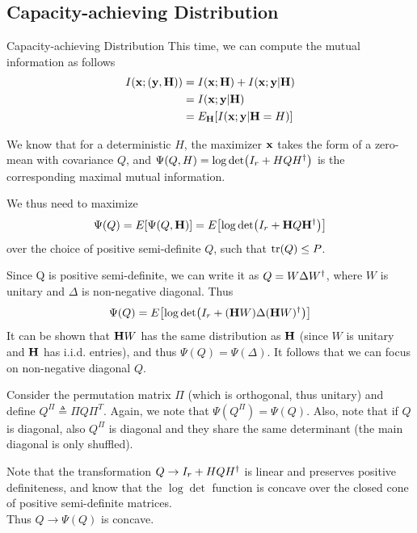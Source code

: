 \subsection{Capacity-achieving Distribution}
\begin{frame}[allowframebreaks]{Capacity-achieving Distribution}
This time, we can compute the mutual information as follows
\begin{align*}
\begin{split}
I(\vb{x;(y,H)}) &= I(\vb{x;H}) + I(\vb{x;y|H})\\
&= I(\vb{x;y|H})\\
&= \Exp[\vb{H}]{I(\vb{x;y|H}=H)}
\end{split}
\end{align*}

We know that for a deterministic $H$, the maximizer $\vb{x}$ takes the form of a zero-mean \cscg{} with covariance $Q$, and $\Psi(Q,H) = \log\det(I_r + HQ\herm{H})$ is the corresponding maximal mutual information.

\medskip
We thus need to maximize
$$\Psi(Q) = \Exp{\Psi(Q,\vb{H})} = \Exp{\log\det(I_r + \vb{H}Q\herm{\vb{H}})}$$
over the choice of positive semi-definite $Q$, such that $\tr(Q)\leq P$.

\framebreak

Since Q is positive semi-definite, we can write it as $Q = W\Delta\herm{W}$, where $W$ is unitary and $\Delta$ is non-negative diagonal. Thus
$$\Psi(Q) = \Exp{\log\det(I_r + (\vb{H}W)\Delta\herm{(\vb{H}W)})}$$
It can be shown that $\vb{H}W$ has the same distribution as $\vb{H}$ (since $W$ is unitary and $\vb{H}$ has i.i.d. entries), and thus $\Psi(Q)=\Psi(\Delta)$. It follows that we can focus on non-negative diagonal $Q$.

\medskip
Consider the permutation matrix $\Pi$ (which is orthogonal, thus unitary) and define $Q^\Pi \triangleq \Pi Q \Pi^T$. Again, we note that $\Psi(Q^\Pi) = \Psi(Q)$. Also, note that if $Q$ is diagonal, also $Q^\Pi$ is diagonal and they share the same determinant (the main diagonal is only shuffled).

\framebreak

Note that the transformation $Q\rightarrow I_r+HQ\herm{H}$ is linear and preserves positive definiteness, and know that the $\log\det$ function is concave over the closed cone of positive semi-definite matrices.\\
Thus $Q\rightarrow \Psi(Q)$ is concave.


\end{frame}
